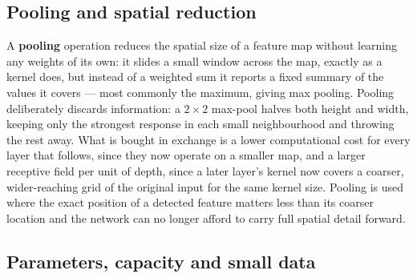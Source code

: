 \subsection{Pooling and spatial reduction}
\label{sec:pooling}

A \textbf{pooling} operation reduces the spatial size of a feature map without learning any weights of its own: it slides a small window across the map, exactly as a kernel does, but instead of a weighted sum it reports a fixed summary of the values it covers --- most commonly the maximum, giving max pooling. Pooling deliberately discards information: a $2\times2$ max-pool halves both height and width, keeping only the strongest response in each small neighbourhood and throwing the rest away. What is bought in exchange is a lower computational cost for every layer that follows, since they now operate on a smaller map, and a larger receptive field per unit of depth, since a later layer's kernel now covers a coarser, wider-reaching grid of the original input for the same kernel size. Pooling is used where the exact position of a detected feature matters less than its coarser location and the network can no longer afford to carry full spatial detail forward.

\subsection{Parameters, capacity and small data}
\label{sec:capacity}

